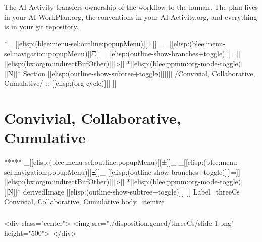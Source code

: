 \begin{whenOrg}
\begin{verblatex}
\begin{frame}[fragile,plain,label=notChatbot]
{The AI-Activity transfers ownership of the workflow to the human. The plan lives in your
AI-WorkPlan.org, the conventions in your AI-Activity.org, and everything is in your git repository.

}

\end{frame}
\end{verblatex}



\begin{whenOrg}
*  _[[elisp:(blee:menu-sel:outline:popupMenu)][±]]_ _[[elisp:(blee:menu-sel:navigation:popupMenu)][Ξ]]_ [[elisp:(outline-show-branches+toggle)][|=]] [[elisp:(bx:orgm:indirectBufOther)][|>]] *[[elisp:(blee:ppmm:org-mode-toggle)][|N]]*  Section    [[elisp:(outline-show-subtree+toggle)][||]]   /Convivial, Collaborative, Cumulative/ ::  [[elisp:(org-cycle)][| ]]
\end{whenOrg}

\section{Convivial, Collaborative, Cumulative}

\begin{whenOrg}
*****  _[[elisp:(blee:menu-sel:outline:popupMenu)][±]]_ _[[elisp:(blee:menu-sel:navigation:popupMenu)][Ξ]]_ [[elisp:(outline-show-branches+toggle)][|=]] [[elisp:(bx:orgm:indirectBufOther)][|>]] *[[elisp:(blee:ppmm:org-mode-toggle)][|N]]*  derivedImage [[elisp:(outline-show-subtree+toggle)][||]] Label=threeCs Convivial, Collaborative, Cumulative body=itemize
\end{whenOrg}

\begin{htmlonly}

\begin{frame}[fragile,plain,label=threeCs]
    \frametitle{}
    \framesubtitle{}
    \begin{rawhtml}
<div class="center">
<img src="./disposition.gened/threeCs/slide-1.png" height="500">
</div>
    \end{rawhtml}
\end{frame}
\end{htmlonly}


\end{whenOrg}
